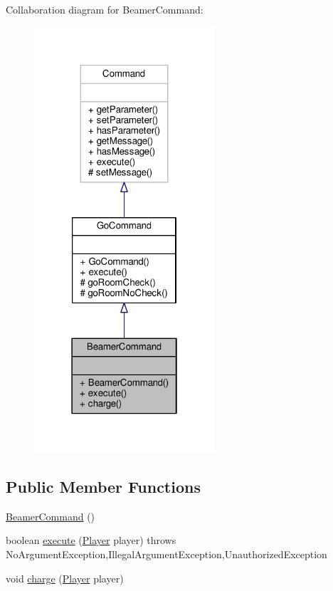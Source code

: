 Collaboration diagram for Beamer\-Command\-:
\nopagebreak
\begin{figure}[H]
\begin{center}
\leavevmode
\includegraphics[width=190pt]{classBeamerCommand__coll__graph}
\end{center}
\end{figure}
\subsection*{Public Member Functions}
\begin{DoxyCompactItemize}
\item 
\hyperlink{classBeamerCommand_accb1d84a69588f1b42fba96bf1b32de5}{Beamer\-Command} ()
\item 
boolean \hyperlink{classBeamerCommand_ab28a7d743569841e463b2c0c65cf6eb1}{execute} (\hyperlink{classPlayer}{Player} player)  throws No\-Argument\-Exception,\-Illegal\-Argument\-Exception,\-Unauthorized\-Exception 
\item 
void \hyperlink{classBeamerCommand_a130a572b2ec0532c92ea5033a098b1ac}{charge} (\hyperlink{classPlayer}{Player} player)
\end{DoxyCompactItemize}
